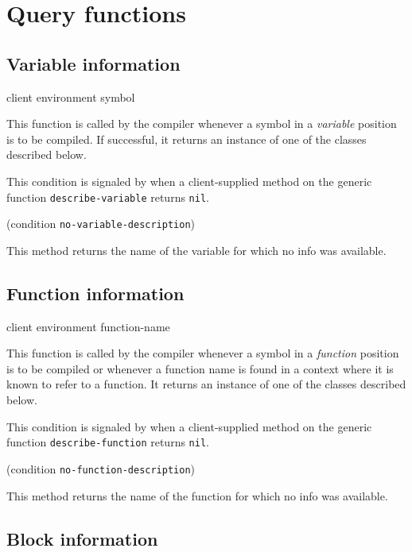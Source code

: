 \section{Query functions}

\subsection{Variable information}

 {client environment symbol}

This function is called by the compiler whenever a symbol in a
\emph{variable} position is to be compiled.  If successful, it returns
an instance of one of the classes described below.


This condition is signaled by \sysname{} when a client-supplied method
on the generic function \texttt{describe-variable} returns \texttt{nil}.

 {(condition {\tt no-variable-description})}

This method returns the name of the variable for which no info was
available.

\subsection{Function information}

 {client environment function-name}

This function is called by the compiler whenever a symbol in a
\emph{function} position is to be compiled or whenever a function name
is found in a context where it is known to refer to a function.  It
returns an instance of one of the classes described below.


This condition is signaled by \sysname{} when a client-supplied method
on the generic function \texttt{describe-function} returns \texttt{nil}.

 {(condition {\tt no-function-description})}

This method returns the name of the function for which no info was
available.

\subsection{Block information}

